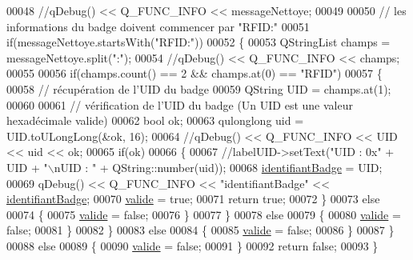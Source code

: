 \begin{DoxyCode}
00048         \textcolor{comment}{//qDebug() << Q\_FUNC\_INFO << messageNettoye;}
00049 
00050         \textcolor{comment}{// les informations du badge doivent commencer par "RFID:"}
00051         \textcolor{keywordflow}{if}(messageNettoye.startsWith(\textcolor{stringliteral}{"RFID:"}))
00052         \{
00053             QStringList champs = messageNettoye.split(\textcolor{stringliteral}{":"});
00054             \textcolor{comment}{//qDebug() << Q\_FUNC\_INFO << champs;}
00055 
00056             \textcolor{keywordflow}{if}(champs.count() == 2 && champs.at(0) == \textcolor{stringliteral}{"RFID"})
00057             \{
00058                 \textcolor{comment}{// récupération de l'UID du badge}
00059                 QString UID = champs.at(1);
00060 
00061                 \textcolor{comment}{// vérification de l'UID du badge (Un UID est une valeur hexadécimale valide)}
00062                 \textcolor{keywordtype}{bool} ok;
00063                 qulonglong uid = UID.toULongLong(&ok, 16);
00064                 \textcolor{comment}{//qDebug() << Q\_FUNC\_INFO << UID << uid << ok;}
00065                 \textcolor{keywordflow}{if}(ok)
00066                 \{
00067                     \textcolor{comment}{//labelUID->setText("UID : 0x" + UID + "\(\backslash\)nUID : " + QString::number(uid));}
00068                     \hyperlink{class_authentification_badge_a7120366168cbe21efd991a978922eb20}{identifiantBadge} = UID;
00069                     qDebug() << Q\_FUNC\_INFO << \textcolor{stringliteral}{"identifiantBadge"} << 
      \hyperlink{class_authentification_badge_a7120366168cbe21efd991a978922eb20}{identifiantBadge};
00070                     \hyperlink{class_authentification_badge_a9d0df9da3663b065a3a6a7a1f37a0a69}{valide} = \textcolor{keyword}{true};
00071                     \textcolor{keywordflow}{return} \textcolor{keyword}{true};
00072                 \}
00073                 \textcolor{keywordflow}{else}
00074                 \{
00075                     \hyperlink{class_authentification_badge_a9d0df9da3663b065a3a6a7a1f37a0a69}{valide} = \textcolor{keyword}{false};
00076                 \}
00077             \}
00078             \textcolor{keywordflow}{else}
00079             \{
00080                 \hyperlink{class_authentification_badge_a9d0df9da3663b065a3a6a7a1f37a0a69}{valide} = \textcolor{keyword}{false};
00081             \}
00082         \}
00083         \textcolor{keywordflow}{else}
00084         \{
00085             \hyperlink{class_authentification_badge_a9d0df9da3663b065a3a6a7a1f37a0a69}{valide} = \textcolor{keyword}{false};
00086         \}
00087     \}
00088     \textcolor{keywordflow}{else}
00089     \{
00090         \hyperlink{class_authentification_badge_a9d0df9da3663b065a3a6a7a1f37a0a69}{valide} = \textcolor{keyword}{false};
00091     \}
00092     \textcolor{keywordflow}{return} \textcolor{keyword}{false};
00093 \}
\end{DoxyCode}


